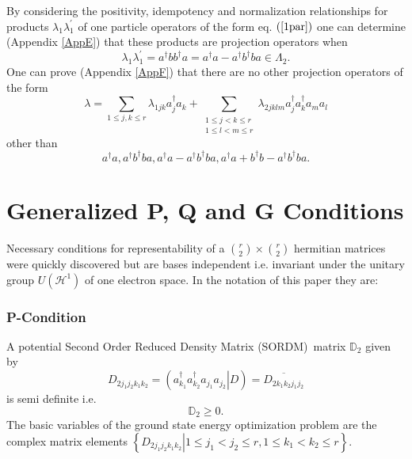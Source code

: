 \documentclass[aps,preprint]{revtex4}%
\begin{document}
By considering the positivity, idempotency and normalization relationships for
products $\lambda_{1}\lambda_{1}^{\prime}$ of one particle operators of the
form eq. $\left(  \ref{1par}\right)  $ one can determine (Appendix \ref{AppE})
that these products are projection operators when
\begin{equation}
\lambda_{1}\lambda_{1}^{\prime}=a^{\dagger}bb^{\dagger}a=a^{\dagger
}a-a^{\dagger}b^{\dagger}ba\in\Lambda_{2}.
\end{equation}
One can prove (Appendix \ref{AppF}) that there are no other projection
operators of the form
\begin{equation}
\lambda=\sum_{1\leq j,k\leq r}\lambda_{1jk}a_{j}^{\dagger}a_{k}+\sum
_{\substack{1\leq j<k\leq r\\1\leq l<m\leq r}}\lambda_{2jklm}a_{j}^{\dagger
}a_{k}^{\dagger}a_{m}a_{l}%
\end{equation}
other than
\begin{equation}
a^{\dagger}a,a^{\dagger}b^{\dagger}ba,a^{\dagger}a-a^{\dagger}b^{\dagger
}ba,a^{\dagger}a+b^{\dagger}b-a^{\dagger}b^{\dagger}ba.
\end{equation}


\section{Generalized P, Q and G Conditions \label{PQG}}

Necessary conditions for representability of a $\binom{r}{2}\times\binom{r}%
{2}$ hermitian matrices were quickly discovered \cite{PQG} but are bases
independent i.e. invariant under the unitary group $U\left(  \mathcal{H}%
^{1}\right)  $ of one electron space. In the notation of this paper they are:

\subsubsection{P-Condition}

A potential Second Order Reduced Density Matrix (SORDM)\ matrix $\mathbb{D}%
_{2}$ given by
\begin{equation}
D_{2j_{1}j_{2}k_{1}k_{2}}=\left(  \left.  a_{k_{1}}^{\dagger}a_{k_{2}%
}^{\dagger}a_{j_{1}}a_{j_{2}}\right\vert D\right)  =\overline{D_{2k_{1}%
k_{2}j_{1}j_{2}}}%
\end{equation}
is semi definite i.e.
\begin{equation}
\mathbb{D}_{2}\geq0.
\end{equation}
The basic variables of the ground state energy optimization problem are the
complex matrix elements $\left\{  \left.  D_{2j_{1}j_{2}k_{1}k_{2}}\right\vert
1\leq j_{1}<j_{2}\leq r,1\leq k_{1}<k_{2}\leq r\right\}  .$
\end{document}
